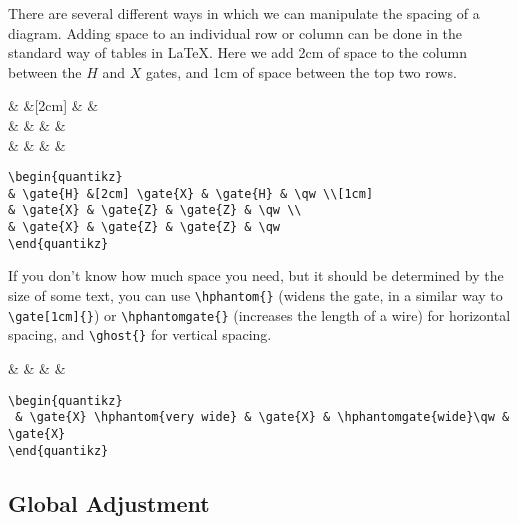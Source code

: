 \documentclass[aps,pra,10pt,nofootinbib]{revtex4}
\begin{document}
There are several different ways in which we can manipulate the spacing of a diagram. Adding space to an individual row or column can be done in the standard way of tables in LaTeX. Here we add 2cm of space to the column between the $H$ and $X$ gates, and 1cm of space between the top two rows.
\begin{Code}
\begin{center}
\begin{quantikz}
&  &[2cm]  &  & \qw \\[1cm]
&  &  &  &\qw \\
&  &  &  & \qw
\end{quantikz}
\end{center}
\tcblower
\begin{lstlisting}
\begin{quantikz}
& \gate{H} &[2cm] \gate{X} & \gate{H} & \qw \\[1cm]
& \gate{X} & \gate{Z} & \gate{Z} & \qw \\
& \gate{X} & \gate{Z} & \gate{Z} & \qw
\end{quantikz}
\end{lstlisting}
\end{Code}
If you don't know how much space you need, but it should be determined by the size of some text, you can use \verb!\hphantom{}! (widens the gate, in a similar way to \verb!\gate[1cm]{}!) or \verb!\hphantomgate{}! (increases the length of a wire) for horizontal spacing, and \verb!\ghost{}! for vertical spacing.
\begin{Code}
\begin{center}
\begin{quantikz}
&  \hphantom{very wide} &  & \qw & 
\end{quantikz}
\end{center}
\tcblower
\begin{lstlisting}
\begin{quantikz}
 & \gate{X} \hphantom{very wide} & \gate{X} & \hphantomgate{wide}\qw & \gate{X}
\end{quantikz}
\end{lstlisting}
\end{Code} 

\subsection{Global Adjustment}
\end{document}
